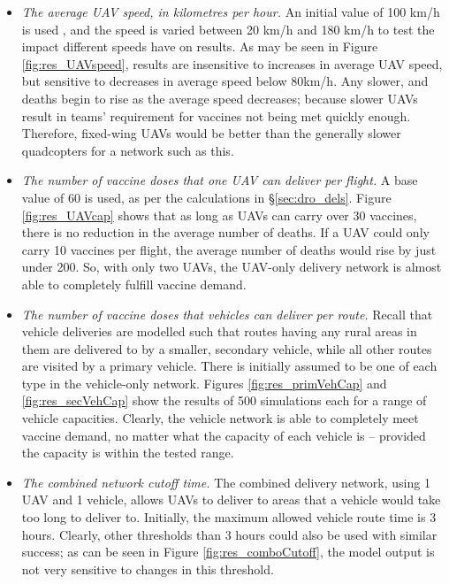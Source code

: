 \label{sec:res_del_params}
\begin{itemize}
    \item \textit{The average UAV speed, in kilometres per hour.} An initial value of 100 km/h is used \cite{czerwonka_2018,service_contract_2018, zipline_impact}, and the speed is varied between 20 km/h and 180 km/h to test the impact different speeds have on results. As may be seen in Figure \ref{fig:res_UAVspeed}, results are insensitive to increases in average UAV speed, but sensitive to decreases in average speed below 80km/h. Any slower, and deaths begin to rise as the average speed decreases; because slower UAVs result in teams' requirement for vaccines not being met quickly enough. Therefore, fixed-wing UAVs would be better than the generally slower quadcopters for a network such as this.
    \item \textit{The number of vaccine doses that one UAV can deliver per flight.} A base value of 60 is used, as per the calculations in \S \ref{sec:dro_dels}. Figure \ref{fig:res_UAVcap} shows that as long as UAVs can carry over 30 vaccines, there is no reduction in the average number of deaths. If a UAV could only carry 10 vaccines per flight, the average number of deaths would rise by just under 200. So, with only two UAVs, the UAV-only delivery network is almost able to completely fulfill vaccine demand.
    \item \textit{The number of vaccine doses that vehicles can deliver per route.} Recall that vehicle deliveries are modelled such that routes having any rural areas in them are delivered to by a smaller, secondary vehicle, while all other routes are visited by a primary vehicle. There is initially assumed to be one of each type in the vehicle-only network. Figures \ref{fig:res_primVehCap} and \ref{fig:res_secVehCap} show the results of 500 simulations each for a range of vehicle capacities. Clearly, the vehicle network is able to completely meet vaccine demand, no matter what the capacity of each vehicle is -- provided the capacity is within the tested range.
    \item \textit{The combined network cutoff time.} The combined delivery network, using 1 UAV and 1 vehicle, allows UAVs to deliver to areas that a vehicle would take too long to deliver to. Initially, the maximum allowed vehicle route time is 3 hours. Clearly, other thresholds than 3 hours could also be used with similar success; as can be seen in Figure \ref{fig:res_comboCutoff}, the model output is not very sensitive to changes in this threshold.
\end{itemize}

